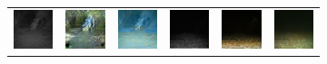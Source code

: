 \begin{figure}[htp!]
\begin{subfigure}{\textwidth}
\begin{tabularx}{\textwidth}{Y Y Y !{\space} Y Y Y}
            \includegraphics{gfx/conditional-diffusion-sampling-caltech-qual/nir_5860ede3-23d2-11e8-a6a3-ec086b02610b.jpg} & \includegraphics{gfx/conditional-diffusion-sampling-caltech-qual/cyclegan_5860ede3-23d2-11e8-a6a3-ec086b02610b_fake.png} & \includegraphics{gfx/conditional-diffusion-sampling-caltech-qual/diffusion_5860ede3-23d2-11e8-a6a3-ec086b02610b.png} & \includegraphics{gfx/conditional-diffusion-sampling-qual/nir_S2_B06_R3_PICT3848.jpg} & \includegraphics{gfx/conditional-diffusion-sampling-qual/cyclegan_S2_B06_R3_PICT3848_fake.png} & \includegraphics{gfx/conditional-diffusion-sampling-qual/diffusion_S2_B06_R3_PICT3848.png}

\end{tabularx}
\end{subfigure}
\end{figure}
